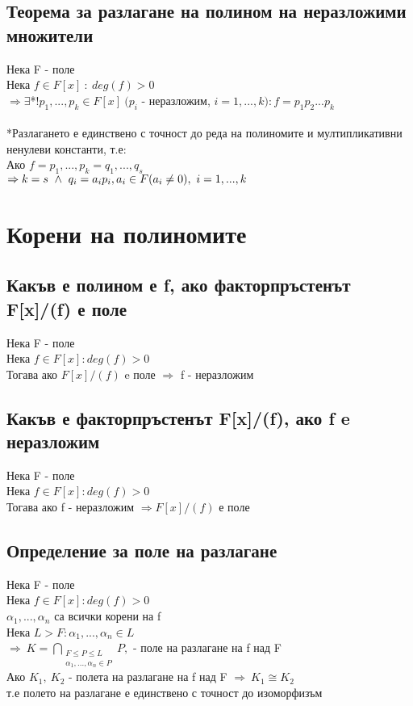 \documentclass[12pt]{article}
\begin{document}
\subsection{Теорема за разлагане на полином на неразложими множители}
Нека F - поле \\
Нека $f \in F[x]\ :\ deg(f) > 0$ \\
$\Rightarrow \exists $*$! p_1,...,p_k \in F[x] \ (p_i$ - неразложим, $i = 1,...,k) : f = p_1p_2...p_k$ \\ \\
*Разлагането е единствено с точност до реда на полиномите и мултипликативни ненулеви константи, т.е: \\
Ако $f = p_1,...,p_k = q_1,...,q_s$ \\
$\Rightarrow k = s \ \land \ q_i=a_ip_i,\\
 a_i \in F (a_i \neq 0),\ i=1,...,k$ \\

\section{Корени на полиномите}

\subsection{Какъв е полином е f, ако факторпръстенът F[x]/(f) е поле}
Нека F - поле \\
Нека $f \in F[x] : deg(f) > 0$ \\
Тогава ако $F[x]/(f)$ e поле $ \Rightarrow$ f - неразложим

\subsection{Какъв е факторпръстенът F[x]/(f), ако f e неразложим}
Нека F - поле \\
Нека $f \in F[x] : deg(f) > 0$ \\
Тогава ако f - неразложим $\Rightarrow F[x]/(f)$ е поле 

\subsection{Определение за поле на разлагане}
Нека F - поле\\
Нека $f \in F[x] : deg(f) > 0$\\
$\alpha_1,...,\alpha_n$ са всички корени на f\\
Нека $L > F : \alpha_1,...,\alpha_n \in L$ \\
$\Rightarrow\ K = \bigcap\limits_{\substack{F \leq P \leq L \\ \alpha_1,...,\alpha_n \in P}} P,  $ - поле на разлагане на f над F\\
Ако $K_1,\ K_2$ - полета на разлагане на f над F $\Rightarrow\ K_1 \cong K_2$\\
т.е полето на разлагане е единствено с точност до изоморфизъм
\end{document}
